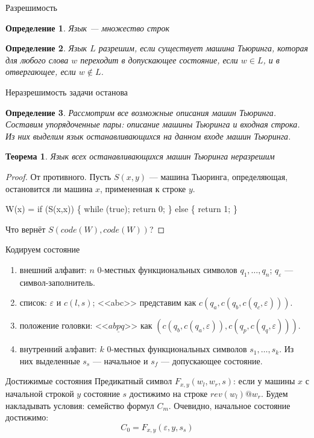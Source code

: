 \documentclass[aspectratio=169]{beamer}
\newtheorem{thm}{Теорема}[section]
\newtheorem{dfn}{Определение}[section]
\begin{document}
\begin{frame}{Разрешимость}
\begin{dfn}Язык --- множество строк\end{dfn}
\begin{dfn}Язык $L$ разрешим, если существует машина Тьюринга, которая для любого слова $w$ переходит в допускающее состояние, если $w \in L$,
и в отвергающее, если $w \notin L$.\end{dfn}
\end{frame}

\begin{frame}{Неразрешимость задачи останова}
\begin{dfn}Рассмотрим все возможные описания машин Тьюринга. Составим упорядоченные пары: описание машины Тьюринга и входная строка.
Из них выделим язык останавливающихся на данном входе машин Тьюринга.\end{dfn}
\begin{thm}Язык всех останавливающихся машин Тьюринга неразрешим\end{thm}
\begin{proof}От противного. Пусть $S(x,y)$ --- машина Тьюринга, определяющая, остановится ли машина $x$, примененная к строке $y$.\pause
\begin{center}W(x) = if (S(x,x)) \{ while (true); return 0; \} else \{ return 1; \}\end{center}\pause
Что вернёт $S(code(W),code(W))$?
\end{proof}
\end{frame}

\begin{frame}{Кодируем состояние}
\begin{enumerate}
\item внешний алфавит: $n$ 0-местных функциональных символов $q_1, \dots, q_n$; $q_\varepsilon$ --- символ-заполнитель.
\item список: $\varepsilon$ и $c(l,s)$; <<abc>> представим как $c(q_a,c(q_b,c(q_c,\varepsilon)))$.
\item положение головки: <<$ab\underline{p}q$>> как $(c(q_b,c(q_a,\varepsilon)), c(q_p,c(q_q,\varepsilon)))$.
\item внутренний алфавит: $k$ 0-местных функциональных символов $s_1, \dots, s_k$. Из них выделенные $s_s$ --- начальное и
$s_f$ --- допускающее состояние.
\end{enumerate}
\end{frame}

\begin{frame}{Достижимые состояния}
Предикатный символ $F_{x,y}(w_l,w_r,s)$: если у машины $x$ с начальной строкой $y$ состояние $s$ достижимо на строке $rev(w_l) @ w_r$. 
\pause
Будем накладывать условия: семейство формул $C_m$. \pause
Очевидно, начальное состояние достижимо:
$$C_0 = F_{x,y}(\varepsilon,y,s_s)$$
\end{frame}
\end{document}
